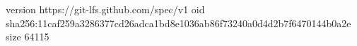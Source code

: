 version https://git-lfs.github.com/spec/v1
oid sha256:11caf259a3286377cd26adca1bd8e1036ab86f73240a0d4d2b7f6470144b0a2e
size 64115
